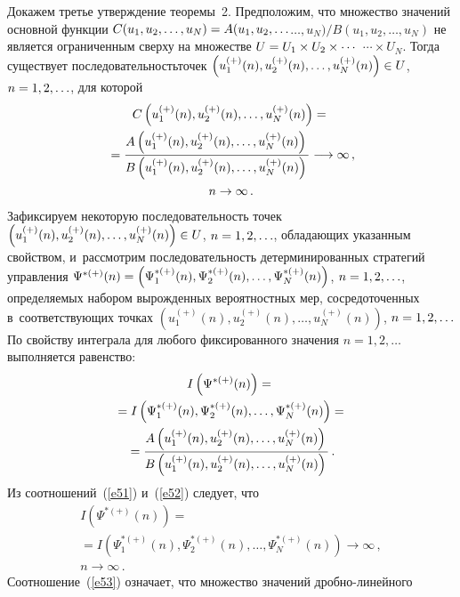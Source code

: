 \begin{multicols}{2}
Докажем третье утверждение теоремы~2. Предположим, что множество значений 
основной функции $C(u_1, u_2,\ldots, u_N)\hm=
A(u_1, u_2,\ldots$\linebreak $\ldots, u_N)/{B(u_1, u_2,\ldots, u_N)}$
не является ограниченным сверху на множестве $U\hm=U_1\times U_2 \times \cdots $\linebreak
$\cdots \times U_N$.
Тогда существует последовательность\linebreak точек $\left(u_1^{(+)}(n), u_2^{(+)}(n),
\ldots,u_N^{(+)}(n)\right)\hm\in U$, $n\hm=1,2,\ldots$, для которой
\begin{multline}
C\left(u_1^{(+)}(n), u_2^{(+)}(n),\ldots,u_N^{(+)}(n)\right)={}\\
{}=
\displaystyle\frac{\displaystyle A\left(u_1^{(+)}(n), u_2^{(+)}(n),\ldots,u_N^{(+)}(n)\right)\mathstrut}{\displaystyle B\left(u_1^{(+)}(n), u_2^{(+)}(n),\ldots,u_N^{(+)}(n)\right)\mathstrut}
\longrightarrow \infty \,,\\
n\rightarrow \infty\,.
\label{e51}
\end{multline}
Зафиксируем некоторую последовательность точек $\left(u_1^{(+)}(n), u_2^{(+)}(n),
\ldots,u_N^{(+)}(n)\right)\hm\in U$, $n\hm=1,2,\ldots$, обладающих указанным свойством, 
и~рассмотрим последовательность детерминированных  стратегий управления 
$\Psi^{*(+)}(n)\hm=\left(\Psi_1^{*(+)}(n), \Psi_2^{*(+)}(n),\ldots, 
\Psi_N^{*(+)}(n)\right)$, $n\hm=1,2,\ldots$, определяемых набором вырожденных 
вероятностных мер, сосредоточенных в~соответствующих точках 
$\left(u_1^{(+)}(n), u_2^{(+)}(n),\ldots,u_N^{(+)}(n)\right)$, $n\hm=1,2,\ldots$ 
По свойству интеграла для любого фиксированного значения $n=1,2,\ldots$ 
выполняется равенство:
\begin{multline}
I \left(\Psi^{*(+)}(n)\right)={}\\
{}=I\left(\Psi_1^{*(+)}(n), \Psi_2^{*(+)}(n),\ldots,
 \Psi_N^{*(+)}(n)\right)={}\\
{}=\displaystyle\frac{\displaystyle A\left(u_1^{(+)}(n), u_2^{(+)}(n),\ldots,u_N^{(+)}(n)\right)\mathstrut}{\displaystyle B\left(u_1^{(+)}(n), u_2^{(+)}(n),\ldots,u_N^{(+)}(n)\right)\mathstrut}\,. 
\label{e52}
\end{multline}
Из соотношений~(\ref{e51}) и~(\ref{e52}) следует, что
\begin{multline}
I\left(\Psi^{*(+)}(n)\right)={}\\
{}=I\left(\Psi_1^{*(+)}(n), \Psi_2^{*(+)}(n),\ldots, 
\Psi_N^{*(+)}(n)\right)\longrightarrow\infty\,,\\ 
n \rightarrow\infty\,.
 \label{e53}
\end{multline}
Соотношение~(\ref{e53}) означает, что множество значе\-ний дроб\-но-ли\-ней\-но\-го 

\end{multicols}
